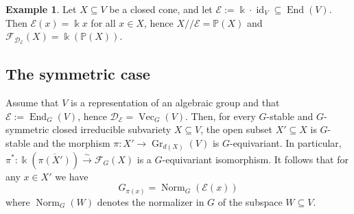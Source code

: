 \documentclass{amsart}
\theoremstyle{definition}
\newtheorem{exa}[thm]{Example}
\theoremstyle{remark}
\begin{document}
\begin{exa}\label{kId.exa}
Let $X {\subseteq} V$ be a closed cone, and let ${\mathcal E}:={\Bbbk}\cdot\operatorname{id}_{V} {\subseteq} \operatorname{End}(V)$. Then ${\mathcal E}(x) = {\Bbbk} x$ for all $x \in X$, hence $X{/\!\!/} {\mathcal E} = {\mathbb P}(X)$ and ${\mathcal F}_{{\mathcal D}_{\mathcal E}}(X) = {\Bbbk}({\mathbb P}(X))$.
\end{exa}

{\par\smallskip}
\subsection{The symmetric case}
Assume that $V$ is a representation of an algebraic group and that ${\mathcal E} := \operatorname{End}_{G}(V)$, hence ${\mathcal D}_{\mathcal E} = \operatorname{Vec}_{G}(V)$. Then, for every $G$-stable and $G$-symmetric closed irreducible subvariety $X {\subseteq} V$, the open subset $X' {\subseteq} X$ is $G$-stable and the morphism $\pi\colon X' \to \operatorname{Gr}_{d(X)}(V)$ is $G$-equivariant. In particular, $\pi^{*}\colon {\Bbbk}(\overline{\pi(X')}) {\xrightarrow{\sim}} {\mathcal F}_{G}(X)$ is a $G$-equivariant isomorphism. It follows that for any $x\in X'$ we have
$$
G_{\pi(x)} = \operatorname{Norm}_{G}({\mathcal E}(x))
$$
where $\operatorname{Norm}_{G}(W)$ denotes the normalizer in $G$ of the subspace $W {\subseteq} V$. 
\end{document}
